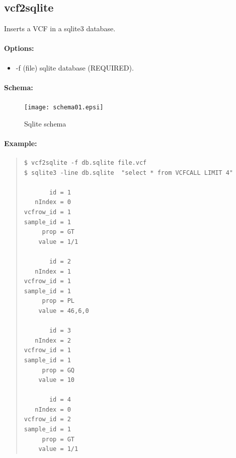 \documentclass[12pt]{article}
\begin{document}
\subsection{vcf2sqlite}
Inserts a VCF in a sqlite3 database.
\paragraph{Options:}
\begin{itemize}
\item-f (file) sqlite database (REQUIRED).
\end{itemize}
\paragraph{Schema:}
\begin{figure}
\texttt{[image: schema01.epsi]}
\caption{Sqlite schema}
\end{figure}
\paragraph{Example:}
\begin{quote}
\begin{verbatim}
$ vcf2sqlite -f db.sqlite file.vcf
$ sqlite3 -line db.sqlite  "select * from VCFCALL LIMIT 4"

       id = 1
   nIndex = 0
vcfrow_id = 1
sample_id = 1
     prop = GT
    value = 1/1

       id = 2
   nIndex = 1
vcfrow_id = 1
sample_id = 1
     prop = PL
    value = 46,6,0

       id = 3
   nIndex = 2
vcfrow_id = 1
sample_id = 1
     prop = GQ
    value = 10

       id = 4
   nIndex = 0
vcfrow_id = 2
sample_id = 1
     prop = GT
    value = 1/1

\end{verbatim}
\end{quote}





\end{document}
